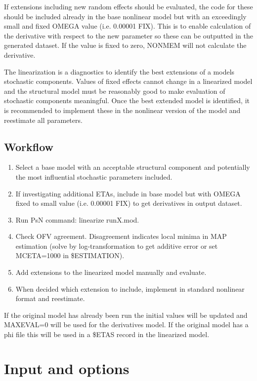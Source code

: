 If extensions including new random effects should be evaluated, the code for these should be included already in the base nonlinear model but with an 
exceedingly small and fixed OMEGA value (i.e. 0.00001 FIX). This is to enable calculation of the derivative with respect to the new parameter so these can 
be outputted in the generated dataset. If the value is fixed to zero, NONMEM will not calculate the derivative. 

The linearization is a diagnostics to identify the best extensions of a models stochastic components. Values of fixed effects cannot change in a linearized
model and the structural model must be reasonably good to make evaluation of stochastic components meaningful. Once the best extended model is identified, 
it is recommended to implement these in the nonlinear version of the model and reestimate all parameters.


\subsection{Workflow}
\begin{enumerate}
\item Select a base model with an acceptable structural component and potentially the most influential stochastic parameters included.
\item If investigating additional ETAs, include in base model but with OMEGA fixed to small value (i.e. 0.00001 FIX) to get derivatives in output dataset.
\item Run PsN command: linearize runX.mod.
\item Check OFV agreement. Disagreement indicates local minima in MAP estimation (solve by log-transformation to get additive error or set MCETA=1000 in \$ESTIMATION).
\item Add extensions to the linearized model manually and evaluate.
\item When decided which extension to include, implement in standard nonlinear format and reestimate.
\end{enumerate}

If the original model has already been run the initial values will be updated and MAXEVAL=0 will be used for the derivatives model.
If the original model has a phi file this will be used in a \$ETAS record in the linearized model.

\section{Input and options}
